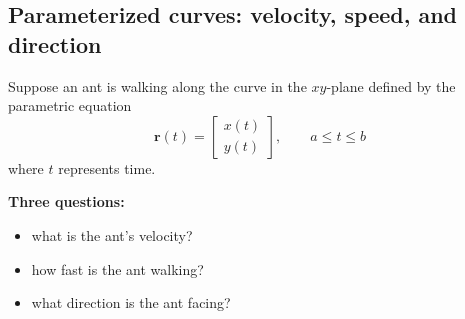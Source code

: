 \documentclass[10pt]{article}
\theoremstyle{definition}
\newcommand{\1}[1]{\textbf{1}_{\left[#1\right]}} %
\begin{document}
\subsection{Parameterized curves: velocity, speed, and direction}
Suppose an ant is walking along the curve in the $xy$-plane defined by the
parametric equation
\begin{equation*}
  \mathbf{r}(t) =
  \begin{bmatrix}
    x(t)\\
    y(t)
  \end{bmatrix},
  \qquad a \leq t \leq b
\end{equation*}
where $t$ represents time.

\noindent
\begin{minipage}[t]{.4\textwidth}
  \vspace{0pt}
  \textbf{Three questions:}
  \begin{itemize}
    \item what is the ant's velocity?
    \item how fast is the ant walking?
    \item what direction is the ant facing?
  \end{itemize}
\end{minipage}
\hfill
\end{document}
